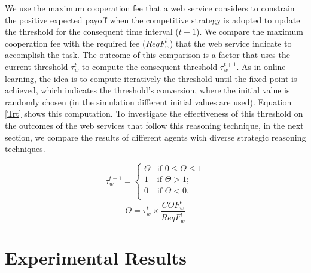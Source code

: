 \documentclass[runningheads,a4paper]{llncs}
\begin{document}
We use the maximum cooperation fee that a web service considers to
constrain the positive expected payoff when the competitive
strategy is adopted to update the threshold for the consequent
time interval ($t+1$). We compare the maximum cooperation fee with
the required fee ($ReqF_w^t$) that the web service indicate to
accomplish the task. The outcome of this comparison is a factor
that uses the current threshold $\tau_w^t$ to compute the
consequent threshold $\tau_w^{t+1}$. As in online learning, the
idea is to compute iteratively the threshold until the fixed point
is achieved, which indicates the threshold's conversion, where the
initial value is randomly chosen (in the simulation different
initial values are used). Equation
\ref{Trt} shows this computation. %
To investigate the effectiveness of this threshold on the outcomes
of the web services that follow this reasoning technique, in the
next section, we compare the results of different agents with
diverse strategic reasoning techniques.

\begin{equation}\label{Trt}
\tau_w^{t+1}=\begin{cases}
\Theta & \text{if $0 \leq \Theta \leq 1$}\\
1 & \text{if $\Theta > 1$;}\\
0 & \text{if $\Theta < 0$.}\\
\end{cases}
\end{equation}
\begin{equation*}
\Theta =\tau_w^t \times \frac{COF_w^t}{ReqF_w^t}
\end{equation*}



\section{Experimental Results}\label{Experimental Results}
\end{document}
